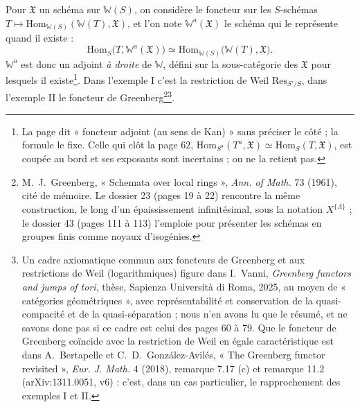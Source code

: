 \documentclass[11pt,a4paper]{article}
\begin{document}
Pour $\mathfrak{X}$ un schéma sur $\mathbb{W}(S)$, on considère le foncteur sur
les $S$-schémas $T \mapsto \mathrm{Hom}_{\mathbb{W}(S)}(\mathbb{W}(T),
\mathfrak{X})$, et l'on note $\mathbb{W}^{a}(\mathfrak{X})$ le schéma qui le
représente quand il existe :
\[
  \mathrm{Hom}_S\bigl(T, \mathbb{W}^{a}(\mathfrak{X})\bigr) \simeq
  \mathrm{Hom}_{\mathbb{W}(S)}\bigl(\mathbb{W}(T), \mathfrak{X}\bigr).
\]
$\mathbb{W}^{a}$ est donc un adjoint \emph{à droite} de $\mathbb{W}$, défini sur
la sous-catégorie des $\mathfrak{X}$ pour lesquels il existe\footnote{La page
dit « foncteur adjoint (au sens de Kan) » sans préciser le côté ; la formule
le fixe. Celle qui clôt la page 62, $\mathrm{Hom}_{S^{a}}(T^{a}, \mathfrak{X})
\simeq \mathrm{Hom}_S(T, \mathfrak{X})$, est coupée au bord et ses exposants
sont incertains ; on ne la retient pas.}. Dans l'exemple I c'est la
restriction de Weil $\mathrm{Res}_{S'/S}$, dans l'exemple II le foncteur de
Greenberg\footnote{M.~J.~Greenberg, « Schemata over local rings », \emph{Ann.
of Math.} 73 (1961), cité de mémoire. Le dossier 23 (pages 19 à 22) rencontre
la même construction, le long d'un épaississement infinitésimal, sous la
notation $X^{\{\Lambda\}}$ ; le dossier 43 (pages 111 à 113) l'emploie pour
présenter les schémas en groupes finis comme noyaux d'isogénies.}\footnote{Un
cadre axiomatique commun aux foncteurs de Greenberg et aux restrictions de
Weil (logarithmiques) figure dans I.~Vanni, \emph{Greenberg functors and jumps
of tori}, thèse, Sapienza Università di Roma, 2025, au moyen de « catégories
géométriques », avec représentabilité et conservation de la quasi-compacité et
de la quasi-séparation ; nous n'en avons lu que le résumé, et ne savons donc
pas si ce cadre est celui des pages 60 à 79. Que le foncteur de
Greenberg coïncide avec la restriction de Weil en égale caractéristique est
dans A.~Bertapelle et C.~D.~González-Avilés, « The Greenberg functor
revisited », \emph{Eur. J. Math.} 4 (2018), remarque 7.17 (c) et remarque
11.2 (arXiv:1311.0051, v6) : c'est, dans un cas particulier, le rapprochement
des exemples I et II.}.
\end{document}
